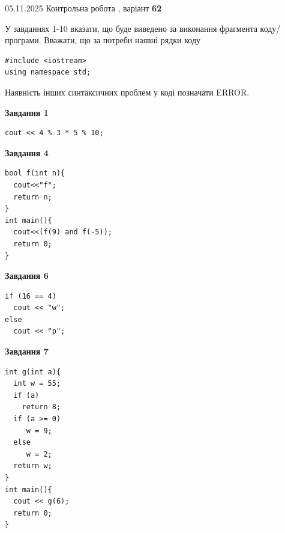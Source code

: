 \documentclass[12pt, ukrainian]{article}
\begin{document}
{\Large{05.11.2025 Контрольна робота , варіант  \No \textbf { 62 }\par}}
{
\begin {large}
У завданнях 1-10 вказати, що буде виведено за виконання фрагмента коду/про\-гра\-ми.
Вважати, що за потреби наявні рядки коду
\begin{verbatim}
#include <iostream>
using namespace std;
\end{verbatim}
Наявність інших синтаксичних проблем у коді позначати ERROR.

\begin{minipage}[t]{7.0cm}

\begin{center}
\textbf{Завдання 1}
\end{center}
\vspace{-8mm}

\begin{verbatim}
cout << 4 % 3 * 5 % 10;
\end{verbatim}



\begin{center}
\textbf{Завдання 4}
\end{center}
\vspace{-8mm}

\begin{verbatim}
bool f(int n){
  cout<<"f";
  return n;
}
int main(){
  cout<<(f(9) and f(-5));
  return 0;
}
\end{verbatim}



\begin{center}
\textbf{Завдання 6}
\end{center}
\vspace{-8mm}

\begin{verbatim}
if (16 == 4)
  cout << "w";
else
  cout << "p";
\end{verbatim}



\begin{center}
\textbf{Завдання 7}
\end{center}
\vspace{-8mm}

\begin{verbatim}
int g(int a){
  int w = 55;
  if (a)
    return 8;
  if (a >= 0)
     w = 9;
  else
     w = 2;
  return w;
}
int main(){
  cout << g(6);
  return 0;
}
\end{verbatim}


\end{minipage}
\end{large}}
\end{document}
